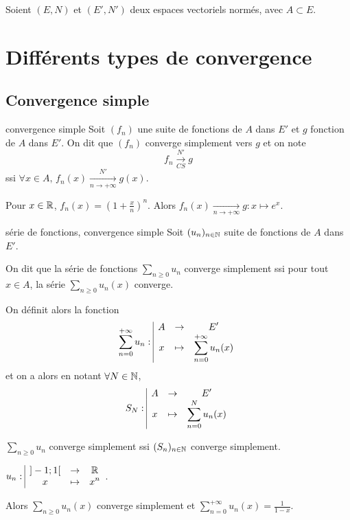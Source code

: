 Soient $(E, N)$ et $(E', N')$ deux espaces vectoriels normés, avec 
$A \subset E$.

\section{Différents types de convergence}
\subsection{Convergence simple }

\begin{definition}{convergence simple}{}
    Soit $(f_n)$ une suite de fonctions de $A$ dans $E'$ et $g$ fonction de $A$ dans $E'$. 
    On dit que $(f_n)$ converge simplement vers $g$ et on note 
    \[
        f_n \xrightarrow[CS]{N'} g 
    \]
    ssi $\forall x \in A, \, f_n(x) \xrightarrow[n\to +\infty]{N'} g(x)$.
\end{definition}

\begin{exemple}
    Pour $x \in \mathbb{R}$, $f_n(x) = \left( 1 + \frac x n \right)^n$.
    Alors $f_n(x) \xrightarrow[n\to +\infty]{} g : x \mapsto e^x$.
\end{exemple}

\begin{definition}{série de fonctions, convergence simple}{}
    Soit $(u_n)_{n \in \mathbb{N}}$ suite de fonctions de $A$ dans $E'$.

    On dit que la série de fonctions $\displaystyle \sum_{n \geqslant 0} u_n$ converge simplement 
    ssi pour tout $x \in A$, la série $\displaystyle \sum_{n \geqslant 0} u_n(x)$ converge.

    On définit alors la fonction 
    \[
        \sum_{n = 0 }^{ + \infty } u_n : \space \begin{array}{|ccc} \displaystyle A & \to & \displaystyle E' \\ \displaystyle x & \mapsto & \displaystyle \sum_{n = 0}^{ + \infty } u_n(x) \end{array}
    \]
    et on a alors en notant $\forall N \in \mathbb{N}$, $$S_N: \space \begin{array}{|ccc} \displaystyle A & \to & \displaystyle E' \\ \displaystyle x & \mapsto & \displaystyle \sum_{n = 0}^N u_n(x) \end{array}$$

    $\displaystyle \sum_{n \geqslant 0} u_n$ converge simplement ssi $(S_n)_{n \in \mathbb{N}}$ converge simplement.

\end{definition}

\begin{exemple}
    $\displaystyle u_n: \space \begin{array}{|ccc} \displaystyle ]-1; 1[ & \to & \displaystyle \mathbb{R} \\ \displaystyle x & \mapsto & \displaystyle x^n \end{array}$.

    Alors $\displaystyle \sum_{n \geqslant 0} u_n(x)$ converge simplement et $\displaystyle \sum_{n = 0}^{ + \infty } u_n(x) = \frac{1}{1-x}$.
\end{exemple}


